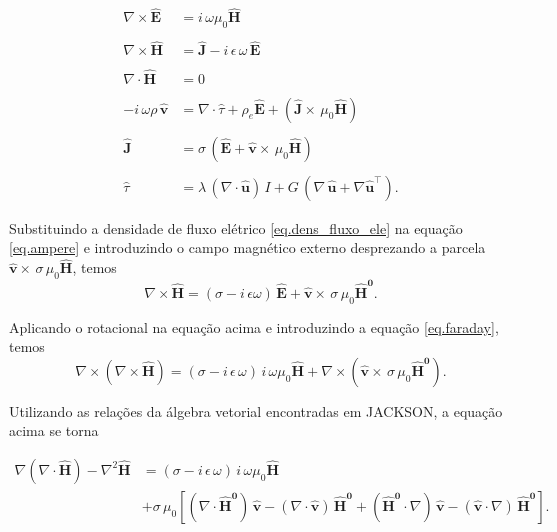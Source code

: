\begin{align}\label{eq.faraday}
\nabla\times\mathbf{\widehat{E}}&=i\,\omega\mu_0\mathbf{\widehat{H}}\\\nonumber\\\label{eq.ampere}
\nabla\times\mathbf{\widehat{H}}&=\mathbf{\widehat{J}}-i\,\epsilon\,\omega\,\mathbf{\widehat{E}}\\\nonumber\\\label{eq.div_B}
\nabla\cdot\mathbf{\widehat{H}}&=0\\\nonumber\\\label{eq.equi_couchy}
-i\,\omega\rho\,\mathbf{\widehat{v}}&=\nabla\cdot\widehat{\tau}+\rho_e\mathbf{\widehat{E}}+(\mathbf{\widehat{J}}\times\,\mu_0\mathbf{\widehat{H}})\\\nonumber\\\label{eq.dens_fluxo_ele}
\mathbf{\widehat{J}}&=\sigma\,(\mathbf{\widehat{E}}+\mathbf{\widehat{v}}\times\,\mu_0\mathbf{\widehat{H}})\\\nonumber\\\label{eq.Lame}
\widehat{\tau}&=\lambda\,(\nabla\cdot\mathbf{\widehat{u}})\,I + G\,(\nabla\,\mathbf{\widehat{u}}+\nabla\mathbf{\widehat{u}}^\top).
\end{align}

Substituindo a densidade de fluxo el\'etrico \ref{eq.dens_fluxo_ele} na equa\c{c}\~ao \ref{eq.ampere} e introduzindo o campo magn\'etico externo desprezando a parcela $\mathbf{\widehat{v}}\times\,\sigma\,\mu_0\mathbf{\widehat{H}}$, temos
\begin{equation*}
\nabla\times\mathbf{\widehat{H}}=(\sigma-i\,\epsilon\omega)\,\mathbf{\widehat{E}}+\mathbf{\widehat{v}}\times\,\sigma\,\mu_0\mathbf{\widehat{H}^0}.
\end{equation*}

Aplicando o rotacional na equa\c{c}\~ao acima e introduzindo a equa\c{c}\~ao \ref{eq.faraday}, temos
\begin{equation*}
\nabla\times(\nabla\times\mathbf{\widehat{H}})=(\sigma-i\,\epsilon\,\omega)\,i\,\omega\mu_0\mathbf{\widehat{H}}+\nabla\times(\mathbf{\widehat{v}}\times\,\sigma\,\mu_0\mathbf{\widehat{H}^0}).
\end{equation*}

Utilizando as rela\c{c}\~oes da \'algebra vetorial encontradas em JACKSON, a equa\c{c}\~ao acima se torna

\begin{align*}
\nabla(\nabla\cdot\mathbf{\widehat{H}})-\nabla^2\mathbf{\widehat{H}}&=(\sigma-i\,\epsilon\,\omega)\,i\,\omega\mu_0\mathbf{\widehat{H}}\\
&+\sigma\,\mu_0\left[(\nabla\cdot\mathbf{\widehat{H}^0})\,\mathbf{\widehat{v}}-(\nabla\cdot\mathbf{\widehat{v}})\,\mathbf{\widehat{H}^0}+(\mathbf{\widehat{H}^0}\cdot\nabla)\,\mathbf{\widehat{v}}-(\mathbf{\widehat{v}}\cdot\nabla)\,\mathbf{\widehat{H}^0}\right].
\end{align*}

